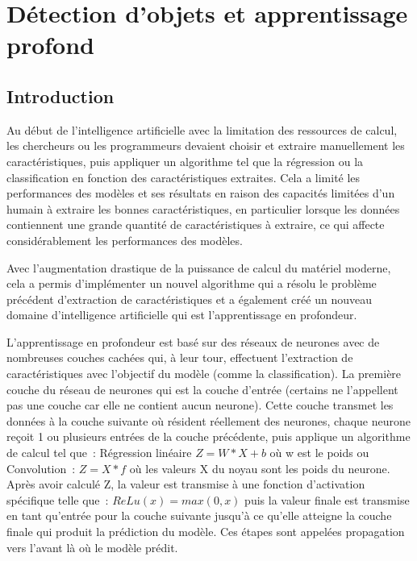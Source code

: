 \chapter{Détection d'objets et apprentissage profond}
\newpage
\pagestyle{fancy}
\fancyhead[L]{\chaptername \ \thechapter}
\renewcommand{\headrulewidth}{1pt}
\fancyfoot[C]{\thepage}
\section{Introduction} 
Au début de l'intelligence artificielle avec la limitation des ressources de calcul, les chercheurs ou les programmeurs devaient choisir et extraire manuellement les caractéristiques, puis appliquer un algorithme tel que la régression ou la classification en fonction des caractéristiques extraites. Cela a limité les performances des modèles et ses résultats en raison des capacités limitées d'un humain à extraire les bonnes caractéristiques, en particulier lorsque les données contiennent une grande quantité de caractéristiques à extraire, ce qui affecte considérablement les performances des modèles.

Avec l'augmentation drastique de la puissance de calcul du matériel moderne, cela a permis d'implémenter un nouvel algorithme qui a résolu le problème précédent d'extraction de caractéristiques et a également créé un nouveau domaine d'intelligence artificielle qui est l'apprentissage en profondeur.

L'apprentissage en profondeur est basé sur des réseaux de neurones avec de nombreuses couches cachées qui, à leur tour, effectuent l'extraction de caractéristiques avec l'objectif du modèle (comme la classification). La première couche du réseau de neurones qui est la couche d'entrée (certains ne l'appellent pas une couche car elle ne contient aucun neurone). Cette couche transmet les données à la couche suivante où résident réellement des neurones, chaque neurone reçoit 1 ou plusieurs entrées de la couche précédente, puis applique un algorithme de calcul tel que : Régression linéaire \(Z = W * X + b\) où w est le poids ou Convolution : \(Z = X * f\) où les valeurs X du noyau sont les poids du neurone. Après avoir calculé Z, la valeur est transmise à une fonction d'activation spécifique telle que : \(ReLu(x) = max(0,x)\) puis la valeur finale est transmise en tant qu'entrée pour la couche suivante jusqu'à ce qu'elle atteigne la couche finale qui produit la prédiction du modèle. Ces étapes sont appelées propagation vers l'avant là où le modèle prédit. 

